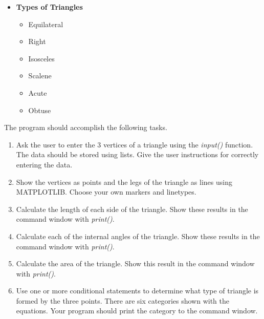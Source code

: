 \documentclass[12pt]{article}
\begin{document}
\begin{description}[labelindent=1cm]
\begin{itemize}
             \vspace{2mm}\\
             \vspace{2mm}\\
             \vspace{2mm}\\   

            \item \textbf{Types of Triangles}
                \begin{itemize}
                \item Equilateral
                \item Right
                \item Isosceles
                \item Scalene
                \item Acute 
                \item Obtuse
                \end{itemize} 
        \end{itemize}
        
        \vspace{20mm}

        \newpage
        \item [\textbf{\underline{Program Minimum Requirements:}}] The program should accomplish the following tasks.
        \begin{enumerate}
        \item Ask the user to enter the 3 vertices of a triangle using the {\it input()} function. The data should be stored using lists. Give the user instructions for correctly entering the data. \\
        \item Show the vertices as points and the legs of the triangle as lines using MATPLOTLIB. Choose your own markers and linetypes.  \\
        \item Calculate the length of each side of the triangle. Show these results in the command window with {\it print()}. \\
        \item Calculate each of the internal angles of the triangle. Show these results in the command window  with {\it print()}. \\  
        \item Calculate the area of the triangle. Show this result in the command window  with {\it print()}. \\  
        \item Use one or more conditional statements to determine what type of triangle is formed by the three points. There are six categories shown with the equations. Your program should print the category to the command window. \\
        

\end{enumerate}
\end{description}
\end{document}
